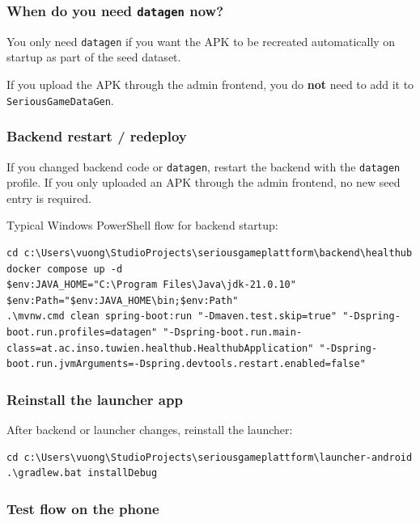 \subsubsection{When do you need \texttt{datagen} now?}\label{when-do-you-need-datagen-now}

You only need \texttt{datagen} if you want the APK to be recreated
automatically on startup as part of the seed dataset.

If you upload the APK through the admin frontend, you do \textbf{not}
need to add it to \texttt{SeriousGameDataGen}.

\subsubsection{Backend restart /
redeploy}\label{backend-restart-redeploy}

If you changed backend code or \texttt{datagen}, restart the backend
with the \texttt{datagen} profile. If you only uploaded an APK through
the admin frontend, no new seed entry is required.

Typical Windows PowerShell flow for backend startup:

\begin{lstlisting}
cd c:\Users\vuong\StudioProjects\seriousgameplattform\backend\healthub
docker compose up -d
$env:JAVA_HOME="C:\Program Files\Java\jdk-21.0.10"
$env:Path="$env:JAVA_HOME\bin;$env:Path"
.\mvnw.cmd clean spring-boot:run "-Dmaven.test.skip=true" "-Dspring-boot.run.profiles=datagen" "-Dspring-boot.run.main-class=at.ac.inso.tuwien.healthub.HealthubApplication" "-Dspring-boot.run.jvmArguments=-Dspring.devtools.restart.enabled=false"
\end{lstlisting}

\subsubsection{Reinstall the launcher
app}\label{reinstall-the-launcher-app}

After backend or launcher changes, reinstall the launcher:

\begin{lstlisting}
cd c:\Users\vuong\StudioProjects\seriousgameplattform\launcher-android
.\gradlew.bat installDebug
\end{lstlisting}

\subsubsection{Test flow on the phone}\label{test-flow-on-the-phone}

